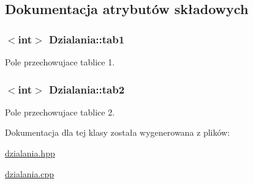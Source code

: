 \subsection{\-Dokumentacja atrybutów składowych}
\hypertarget{class_dzialania_ab4b7bdba95ea206363cf4d0366bf0be5}{
\subsubsection[{tab1}]{$<$int$>$ {\bf \-Dzialania\-::tab1}}}\label{class_dzialania_ab4b7bdba95ea206363cf4d0366bf0be5}


\-Pole przechowujace tablice 1. 

\hypertarget{class_dzialania_ac226e6f7c3854fb9ed36dec2ff476399}{
\subsubsection[{tab2}]{$<$int$>$ {\bf \-Dzialania\-::tab2}}}\label{class_dzialania_ac226e6f7c3854fb9ed36dec2ff476399}


\-Pole przechowujace tablice 2. 



\-Dokumentacja dla tej klasy została wygenerowana z plików\-:\begin{DoxyCompactItemize}
\item 
\hyperlink{dzialania_8hpp}{dzialania.\-hpp}\item 
\hyperlink{dzialania_8cpp}{dzialania.\-cpp}\end{DoxyCompactItemize}
